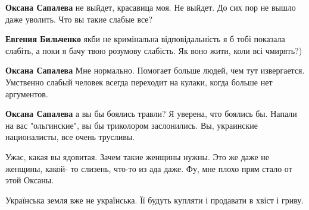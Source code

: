 \begin{itemize}
\begin{itemize}
\textbf{Оксана Сапалева} не выйдет, красавица моя. Не выйдет. До сих пор не вышло даже уволить. Что вы такие слабые все?

 
\textbf{Евгения Бильченко} якби не кримінальна відповідальність я б тобі показала слабіть, а поки я бачу твою розумову слабість. Як воно жити, коли всі чмирять?)

 
\textbf{Оксана Сапалева} Мне нормально. Помогает больше людей, чем тут извергается. Умственно слабый человек всегда переходит на кулаки, когда больше нет аргументов.

 
\textbf{Оксана Сапалева} а вы бы боялись травли? Я уверена, что боялись бы. Напали на вас "ольгинские", вы бы триколором заслонились. Вы, украинские националисты, все очень трусливы.

 
Ужас, какая вы ядовитая. Зачем такие женщины нужны. Это же даже не женщины, какой- то слизень, что-то из ада даже. Фу, мне плохо прям стало от этой Оксаны.

 
Українська земля вже не українська.
Її будуть купляти і продавати в хвіст і гриву.


\end{itemize}
\end{itemize}
